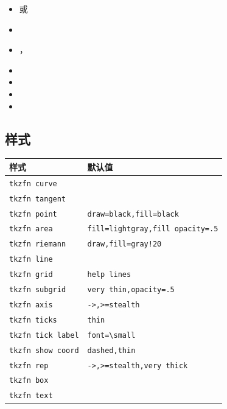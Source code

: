 \begin{itemize}
\item {} 或 
\item {}
\item {}，
\item {}
\item {}
\item {}
\item {}
\end{itemize}

\subsection{样式}

\begin{center}
\begin{tabular}{ll}
\toprule
样式 & 默认值 \\
\midrule
\texttt{tkzfn curve} & \\
\texttt{tkzfn tangent} & \\
\texttt{tkzfn point} & \texttt{draw=black,fill=black} \\
\texttt{tkzfn area} & \texttt{fill=lightgray,fill opacity=.5} \\
\texttt{tkzfn riemann} & \texttt{draw,fill=gray!20} \\
\texttt{tkzfn line} & \\
\texttt{tkzfn grid} & \texttt{help lines} \\
\texttt{tkzfn subgrid} & \texttt{very thin,opacity=.5} \\
\texttt{tkzfn axis} & \texttt{->,>=stealth} \\
\texttt{tkzfn ticks} & \texttt{thin} \\
\texttt{tkzfn tick label} & \texttt{font=\textbackslash small} \\
\texttt{tkzfn show coord} & \texttt{dashed,thin} \\
\texttt{tkzfn rep} & \texttt{->,>=stealth,very thick} \\
\texttt{tkzfn box} & \\
\texttt{tkzfn text} & \\
\bottomrule
\end{tabular}
\end{center}

\endinput
